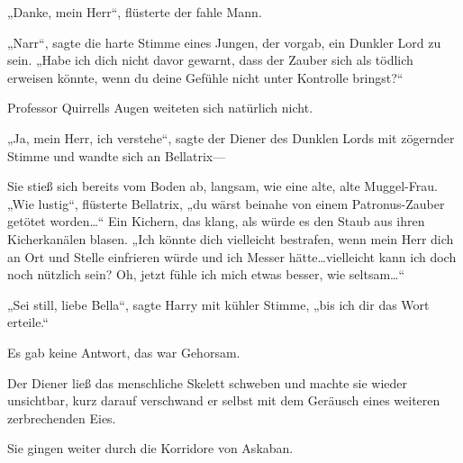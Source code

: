 „Danke, mein Herr“, flüsterte der fahle Mann.

„Narr“, sagte die harte Stimme eines Jungen, der vorgab, ein Dunkler Lord zu sein. „Habe ich dich nicht davor gewarnt, dass der Zauber sich als tödlich erweisen könnte, wenn du deine Gefühle nicht unter Kontrolle bringst?“

Professor Quirrells Augen weiteten sich natürlich nicht.

„Ja, mein Herr, ich verstehe“, sagte der Diener des Dunklen Lords mit zögernder Stimme und wandte sich an Bellatrix—

Sie stieß sich bereits vom Boden ab, langsam, wie eine alte, alte Muggel-Frau. „Wie lustig“, flüsterte Bellatrix, „du wärst beinahe von einem Patronus-Zauber getötet worden…“ Ein Kichern, das klang, als würde es den Staub aus ihren Kicherkanälen blasen. „Ich könnte dich vielleicht bestrafen, wenn mein Herr dich an Ort und Stelle einfrieren würde und ich Messer hätte…vielleicht kann ich doch noch nützlich sein? Oh, jetzt fühle ich mich etwas besser, wie seltsam…“

„Sei still, liebe Bella“, sagte Harry mit kühler Stimme, „bis ich dir das Wort erteile.“

Es gab keine Antwort, das war Gehorsam.

Der Diener ließ das menschliche Skelett schweben und machte sie wieder unsichtbar, kurz darauf verschwand er selbst mit dem Geräusch eines weiteren zerbrechenden Eies.

Sie gingen weiter durch die Korridore von Askaban.

